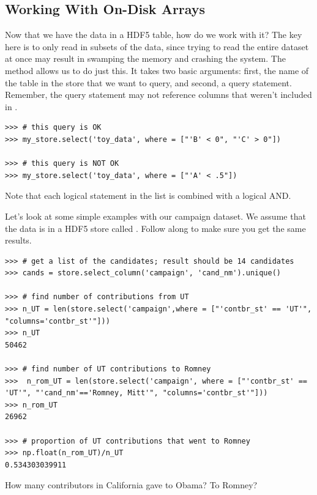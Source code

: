 \subsection*{Working With On-Disk Arrays}
Now that we have the data in a HDF5 table, how do we work with it? The key here is to only read in subsets
of the data, since trying to read the entire dataset at once may result in swamping the memory and crashing
the system. The  method allows us to do just this. It takes two basic arguments: first, the name
of the table in the store that we want to query, and second, a query statement. Remember, the 
query statement may not reference columns that weren't included in .
\begin{lstlisting}
>>> # this query is OK
>>> my_store.select('toy_data', where = ["'B' < 0", "'C' > 0"])

>>> # this query is NOT OK
>>> my_store.select('toy_data', where = ["'A' < .5"])
\end{lstlisting}
Note that each logical statement in the  list is combined with a logical AND.

Let's look at some simple examples with our campaign dataset. We assume that the data is in a HDF5 store called 
. Follow along to make sure you get the same results.
\begin{lstlisting}
>>> # get a list of the candidates; result should be 14 candidates
>>> cands = store.select_column('campaign', 'cand_nm').unique()

>>> # find number of contributions from UT
>>> n_UT = len(store.select('campaign',where = ["'contbr_st' == 'UT'", "columns='contbr_st'"]))
>>> n_UT
50462

>>> # find number of UT contributions to Romney
>>>  n_rom_UT = len(store.select('campaign', where = ["'contbr_st' == 'UT'", "'cand_nm'=='Romney, Mitt'", "columns='contbr_st'"]))
>>> n_rom_UT
26962

>>> # proportion of UT contributions that went to Romney
>>> np.float(n_rom_UT)/n_UT
0.534303039911
\end{lstlisting}

\begin{problem}
How many contributors in California gave to Obama? To Romney?
\end{problem}

